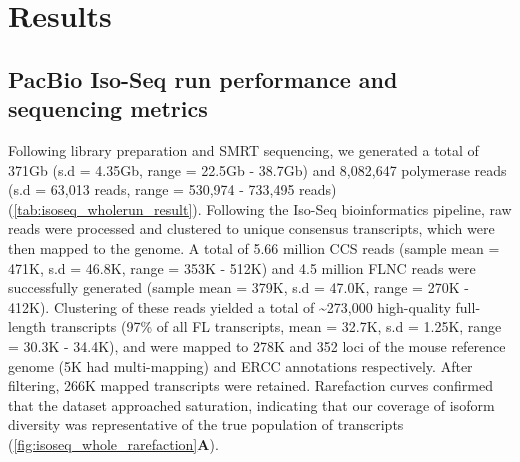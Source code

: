 \newpage
\section{Results}

\subsection{PacBio Iso-Seq run performance and sequencing metrics}
Following library preparation and SMRT sequencing, we generated a total of 371Gb (s.d = 4.35Gb, range = 22.5Gb - 38.7Gb) and 8,082,647 polymerase reads (s.d = 63,013 reads, range = 530,974 - 733,495 reads) (\cref{tab:isoseq_wholerun_result}). Following the Iso-Seq bioinformatics pipeline, raw reads were processed and clustered to unique consensus transcripts, which were then mapped to the genome. A total of 5.66 million CCS reads (sample mean = 471K, s.d = 46.8K, range =  353K - 512K) and 4.5 million FLNC reads were successfully generated (sample mean = 379K, s.d = 47.0K, range = 270K - 412K). Clustering of these reads yielded a total of \textasciitilde273,000 high-quality full-length transcripts (97\% of all FL transcripts, mean = 32.7K, s.d = 1.25K, range = 30.3K - 34.4K), and were mapped to 278K and 352 loci of the mouse reference genome (5K had multi-mapping) and ERCC annotations respectively. After filtering, 266K mapped transcripts were retained. Rarefaction curves confirmed that the dataset approached saturation, indicating that our coverage of isoform diversity was representative of the true population of transcripts (\cref{fig:isoseq_whole_rarefaction}\textbf{A}). 

